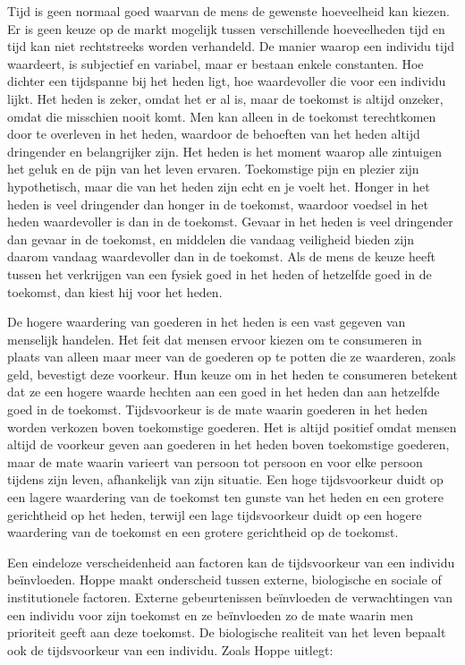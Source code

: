 Tijd is geen normaal goed waarvan de mens de gewenste hoeveelheid kan kiezen. Er is geen keuze op de markt mogelijk tussen verschillende hoeveelheden tijd en tijd kan niet rechtstreeks worden verhandeld. De manier waarop een individu tijd waardeert, is subjectief en variabel, maar er bestaan enkele constanten. Hoe dichter een tijdspanne bij het heden ligt, hoe waardevoller die voor een individu lijkt. Het heden is zeker, omdat het er al is, maar de toekomst is altijd onzeker, omdat die misschien nooit komt. Men kan alleen in de toekomst terechtkomen door te overleven in het heden, waardoor de behoeften van het heden altijd dringender en belangrijker zijn. Het heden is het moment waarop alle zintuigen het geluk en de pijn van het leven ervaren. Toekomstige pijn en plezier zijn hypothetisch, maar die van het heden zijn echt en je voelt het. Honger in het heden is veel dringender dan honger in de toekomst, waardoor voedsel in het heden waardevoller is dan in de toekomst. Gevaar in het heden is veel dringender dan gevaar in de toekomst, en middelen die vandaag veiligheid bieden zijn daarom vandaag waardevoller dan in de toekomst. Als de mens de keuze heeft tussen het verkrijgen van een fysiek goed in het heden of hetzelfde goed in de toekomst, dan kiest hij voor het heden.

De hogere waardering van goederen in het heden is een vast gegeven van menselijk handelen. Het feit dat mensen ervoor kiezen om te consumeren in plaats van alleen maar meer van de goederen op te potten die ze waarderen, zoals geld, bevestigt deze voorkeur. Hun keuze om in het heden te consumeren betekent dat ze een hogere waarde hechten aan een goed in het heden dan aan hetzelfde goed in de toekomst. Tijdsvoorkeur is de mate waarin goederen in het heden worden verkozen boven toekomstige goederen. Het is altijd positief omdat mensen altijd de voorkeur geven aan goederen in het heden boven toekomstige goederen, maar de mate waarin varieert van persoon tot persoon en voor elke persoon tijdens zijn leven, afhankelijk van zijn situatie. Een hoge tijdsvoorkeur duidt op een lagere waardering van de toekomst ten gunste van het heden en een grotere gerichtheid op het heden, terwijl een lage tijdsvoorkeur duidt op een hogere waardering van de toekomst en een grotere gerichtheid op de toekomst.

Een eindeloze verscheidenheid aan factoren kan de tijdsvoorkeur van een individu beïnvloeden. Hoppe maakt onderscheid tussen externe, biologische en sociale of institutionele factoren. Externe gebeurtenissen beïnvloeden de verwachtingen van een individu voor zijn toekomst en ze beïnvloeden zo de mate waarin men prioriteit geeft aan deze toekomst. De biologische realiteit van het leven bepaalt ook de tijdsvoorkeur van een individu. Zoals Hoppe uitlegt:

